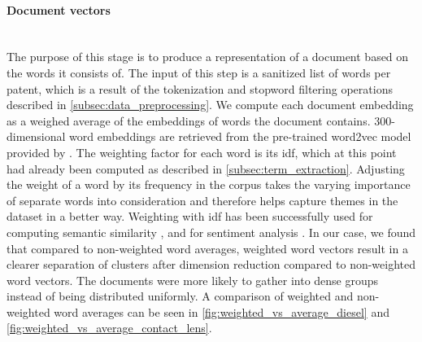 \paragraph{Document vectors}~\\
The purpose of this stage is to produce a representation of a document based on the words it consists of.
The input of this step is a sanitized list of words per patent, which is a result of the tokenization and stopword filtering operations described in \autoref{subsec:data_preprocessing}.
We compute each document embedding as a weighed average of the embeddings of words the document contains.
300-dimensional word embeddings are retrieved from the pre-trained word2vec model provided by \cite{Abood2018a}.
The weighting factor for each word is its \gls{idf}, which at this point had already been computed as described in \autoref{subsec:term_extraction}.
Adjusting the weight of a word by its frequency in the corpus takes the varying importance of separate words into consideration and therefore helps capture themes in the dataset in a better way.
Weighting with \gls{idf} has been successfully used for computing semantic similarity \cite{Zhao2015} \cite{NAGOUDI2018}, \cite{Arora2017} and for sentiment analysis \cite{Correa2017}.
In our case, we found that compared to non-weighted word averages, weighted word vectors result in a clearer separation of clusters after dimension reduction compared to non-weighted word vectors.
The documents were more likely to gather into dense groups instead of being distributed uniformly.
A comparison of weighted and non-weighted word averages can be seen in \autoref{fig:weighted_vs_average_diesel} and \autoref{fig:weighted_vs_average_contact_lens}.

